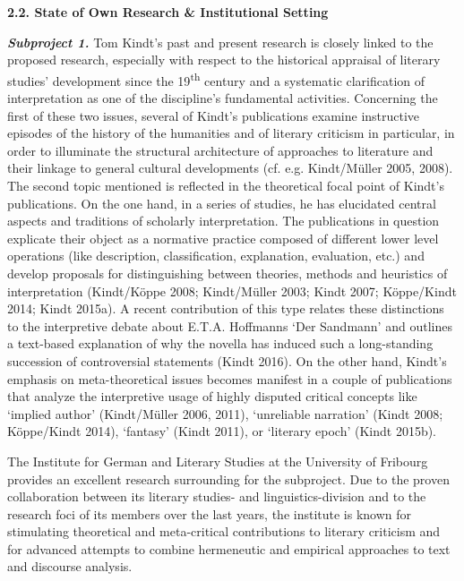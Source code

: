 
\vspace{.6cm}
\noindent\textbf{\large 2.2. State of Own Research \& Institutional Setting}
\vspace{.2cm}

\noindent \textbf{\emph{Subproject 1.}} Tom Kindt's past and present research is closely linked to the proposed research, especially with respect to the historical appraisal of literary studies' development since the 19\textsuperscript{th} century and a systematic clarification of interpretation as one of the discipline's fundamental activities. Concerning the first of these two issues, several of Kindt's publications examine instructive episodes of the history of the humanities and of literary criticism in particular, in order to illuminate the structural architecture of approaches to literature and their linkage to general cultural developments (cf. e.g. Kindt/M\"uller 2005, 2008). The second topic mentioned is reflected in the theoretical focal point of Kindt's publications. On the one hand, in a series of studies, he has elucidated central aspects and traditions of scholarly interpretation. The publications in question explicate their object as a normative practice composed of different lower level operations (like description, classification, explanation, evaluation, etc.) and develop proposals for distinguishing between theories, methods and heuristics of interpretation (Kindt/K\"oppe 2008; Kindt/M\"uller 2003; Kindt 2007; K\"oppe/Kindt 2014; Kindt 2015a). A recent contribution of this type relates these distinctions to the interpretive debate about E.T.A. Hoffmanns `Der Sandmann' and outlines a text-based explanation of why the novella has induced such a long-standing succession of controversial statements (Kindt 2016). On the other hand, Kindt's emphasis on meta-theoretical issues becomes manifest in a couple of publications that analyze the interpretive usage of highly disputed critical concepts like `implied author' (Kindt/M\"uller 2006, 2011), `unreliable narration' (Kindt 2008; K\"oppe/Kindt 2014), `fantasy' (Kindt 2011), or `literary epoch' (Kindt 2015b). 

The Institute for German and Literary Studies at the University of Fribourg provides an excellent research surrounding for the subproject. Due to the proven collaboration between its literary studies- and linguistics-division and to the research foci of its members over the last years, the institute is known for stimulating theoretical and meta-critical contributions to literary criticism and for advanced attempts to combine hermeneutic and empirical approaches to text and discourse analysis.



